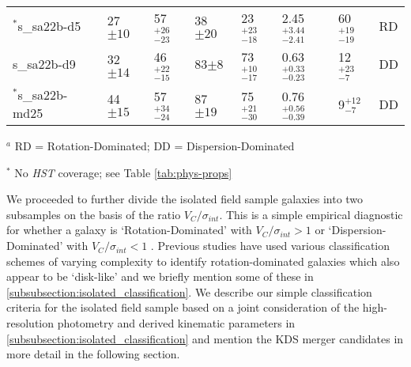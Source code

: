 \documentclass[fleqn,usenatbib]{mnras}
\begin{document}
\begin{table*}
\begin{threeparttable}
\begin{tabular}{llllllll}
$^{*}$s\_sa22b-d5     & 27$\pm10$                    & 57$^{+26}_{-23}$                     & 38$\pm20$                  & 23$^{+23}_{-18}$          & 2.45$^{+3.44}_{-2.41}$               & 60$^{+19}_{-19}$ & RD   \\[1ex]
s\_sa22b-d9     & 32$\pm14$                    & 46$^{+22}_{-15}$                     & 83$\pm8$                  & 73$^{+10}_{-17}$             & 0.63$^{+0.33}_{-0.23}$                 & 12$^{+23}_{-7}$ & DD   \\[1ex]
$^{*}$s\_sa22b-md25   & 44$\pm15$           & 57$^{+34}_{-24}$                     & 87$\pm19$   & 75$^{+21}_{-30}$                   & 0.76$^{+0.56}_{-0.39}$                & 9$^{+12}_{-7}$ & DD

\end{tabular}
\begin{tablenotes}
      \small
      \item $^{a}$ RD = Rotation-Dominated; DD = Dispersion-Dominated
      \item $^{*}$ No {\em HST} coverage; see Table \ref{tab:phys-props}
    \end{tablenotes}
  \end{threeparttable}
  \end{table*}

We proceeded to further divide the isolated field sample galaxies into two subsamples on the basis of the ratio $V_{C}/\sigma_{int}$.
This is a simple empirical diagnostic for whether a galaxy is `Rotation-Dominated' with $V_{C}/\sigma_{int} > 1$ or `Dispersion-Dominated' with $V_{C}/\sigma_{int} < 1$  \citep[i.e. a method to measure the prevalence of rotational and random motions;][]{Epinat2012,Wisnioski2015,Stott2016,Harrison2017}.
Previous studies have used various classification schemes of varying complexity to identify rotation-dominated galaxies which also appear to be `disk-like' and we briefly mention some of these in \cref{subsubsection:isolated_classification}.
We describe our simple classification criteria for the isolated field sample based on a joint consideration of the high-resolution photometry and derived kinematic parameters in \cref{subsubsection:isolated_classification} and mention the KDS merger candidates in more detail in the following section.
\end{document}
